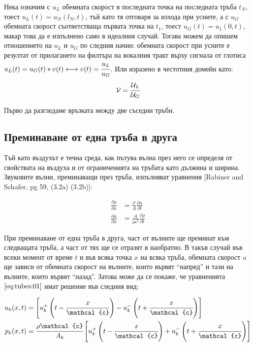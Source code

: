 \documentclass[12pt]{report}
\numberwithin{equation}{section}
\numberwithin{figure}{section}
\newcommand{\B}[1]{\left(#1\right)}
\newcommand{\Q}[1]{\left[#1\right]}
\begin{document}
    Нека означим с $u_L$ обемната скорост в последната точка на последната тръба $t_N$, тоест $u_L(t) = u_N(l_N, t)$, тъй като тя отговаря за изхода при усните, 
    а с $u_G$ обемната скорост съответстваща първата точка на $t_1$, тоест $u_G(t) = u_1(0, t)$, макар това да е изпълнено само в идеалния случай.
    Тогава можем да опишем отношението на $u_L$ и $u_G$ по следния начин: обемната скорост при усните е резултат от прилагането на филтъра на вокалния тракт върху сигнала
    от глотиса  $u_L(t) = u_G(t)\ast v(t) \longleftrightarrow v(t) = \cfrac{u_L}{u_G}$.
    Или изразено в честотния домейн като:
    \[
        \mathcal{V} = \cfrac{\mathcal{U}_L}{\mathcal{U}_G}
    \]

    Първо да разгледаме връзката между две съседни тръби.
    
    \subsection{Преминаване от една тръба в друга}

    Тъй като въздухът е течна среда, как пътува вълна през него се определя от свойствата на въздуха и от ограниченията на тръбата като дължина и ширина. Звуковите вълни, преминаващи през
    тръба, изпълняват уравнения [Rabiner and Schafer, pg 59, (3.2a) (3.2b)]:
    
    \begin{subequations}
        \label{eq:tubes:01}
        \begin{align}
            \label{eq:tubes:01:a} \frac{\partial\rho}{\partial x} & = \frac{\rho}{A} \frac{\partial u}{\partial t}\\
            \label{eq:tubes:01:b} \frac{\partial u}{\partial x} & = \frac{A}{\rho \mathcal{c}^2} \frac{\partial \rho}{\partial t}
        \end{align}
    \end{subequations}

    При преминаване от една тръба в друга, част от вълните ще преминат към следващата тръба, а част от тях ще се отразят в наобратно.
    В такъв случай във всеки момент от време $t$ и във всяка точка $x$ на всяка тръба,
    обемната скорост $u$ ще зависи от обемната скорост на вълните,
    които вървят ``напред'' и тази на вълните, които вървят ``назад''.
    Затова може да се покаже, че уравненията $\eqref{eq:tubes:01}$ имат решение във следния вид:

    \begin{subequations}
        \label{eq:tubes:02}
        \begin{align}
            u_{k}(x, t) & = \Q{u_{k}^{+}\B{t - \cfrac{x}{\mathcal{c}}} - u_{k}^{-}\B{t + \cfrac{x}{\mathcal{c}}}}\\
            p_{k}(x, t) & = \cfrac{\rho \mathcal{c}}{A_{k}} \Q{u_{k}^{+}\B{t - \cfrac{x}{\mathcal{c}}} + u_{k}^{-}\B{t + \cfrac{x}{\mathcal{c}}}}
        \end{align}
    \end{subequations}
\end{document}

